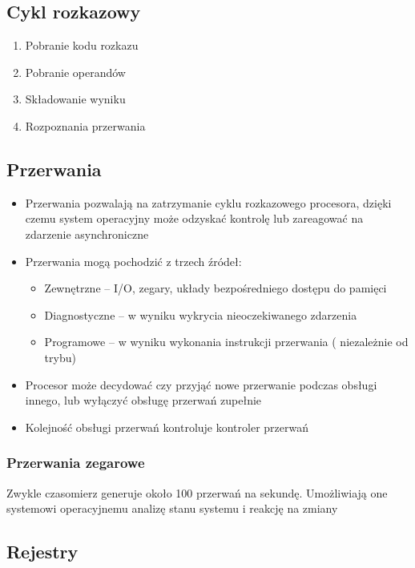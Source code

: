 \documentclass{../notatki}
\begin{document}
\subsection{Cykl rozkazowy}

\begin{enumerate}
  \item Pobranie kodu rozkazu
  \item Pobranie operandów
  \item Składowanie wyniku
  \item Rozpoznania przerwania
\end{enumerate}

\subsection{Przerwania}

\begin{itemize}
  \item Przerwania pozwalają na zatrzymanie cyklu rozkazowego
    procesora, dzięki czemu system operacyjny może odzyskać kontrolę
    lub zareagować na zdarzenie asynchroniczne
  \item Przerwania mogą pochodzić z trzech źródeł:
    \begin{itemize}
      \item Zewnętrzne – I/O, zegary, układy bezpośredniego dostępu do pamięci
      \item Diagnostyczne – w wyniku wykrycia nieoczekiwanego zdarzenia
      \item Programowe – w wyniku wykonania instrukcji przerwania (
        niezależnie od trybu)
    \end{itemize}
  \item Procesor może decydować czy przyjąć nowe przerwanie podczas
    obsługi innego, lub wyłączyć obsługę przerwań zupełnie
  \item Kolejność obsługi przerwań kontroluje kontroler przerwań
\end{itemize}

\subsubsection{Przerwania zegarowe}

Zwykle czasomierz generuje około 100 przerwań na sekundę. Umożliwiają
one systemowi operacyjnemu analizę stanu systemu i reakcję na zmiany

\subsection{Rejestry}
\end{document}
